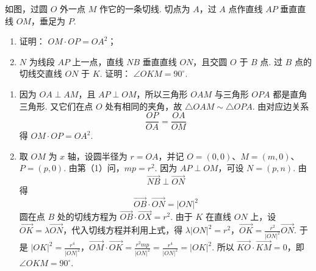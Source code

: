 \begin{problem}
如图，过圆 \(O\) 外一点 \(M\) 作它的一条切线. 切点为 \(A\)，过 \(A\) 点作直线 \(AP\) 垂直直线 \(OM\)，垂足为 \(P\).

\begin{enumerate}
\item 证明： \(OM \cdot OP = OA^2\)；
\item \(N\) 为线段 \(AP\) 上一点，直线 \(NB\) 垂直直线 \(ON\)，且交圆 \(O\) 于 \(B\) 点. 过 \(B\) 点的切线交直线 \(ON\) 于 \(K\). 证明： \(\angle OKM = 90^{\circ}\).
\end{enumerate}


\begin{solution}
\begin{enumerate}
\item 因为 \(OA\perp AM\)，且 \(AP\perp OM\)，所以三角形 \(OAM\) 与三角形 \(OPA\) 都是直角三角形. 又它们在点 \(O\) 处有相同的夹角，故
\(\triangle OAM\sim\triangle OPA\). 由对应边关系
\[
\frac{OP}{OA}=\frac{OA}{OM}
\]
得 \(OM\cdot OP=OA^2\).
\item 取 \(OM\) 为 \(x\) 轴，设圆半径为 \(r=OA\)，并记 \(O=(0,0)\)、\(M=(m,0)\)、\(P=(p,0)\). 由第（1）问，\(mp=r^2\). 因为 \(AP\perp OM\)，可设 \(N=(p,n)\). 由
\[
\overrightarrow{NB}\perp\overrightarrow{ON}
\]
得
\[
\overrightarrow{OB}\cdot\overrightarrow{ON}=|ON|^2
\]
圆在点 \(B\) 处的切线方程为 \(\overrightarrow{OB}\cdot\overrightarrow{OX}=r^2\). 由于 \(K\) 在直线 \(ON\) 上，设 \(\overrightarrow{OK}=\lambda\overrightarrow{ON}\)，代入切线方程并利用上式，得
\(\lambda|ON|^2=r^2\)，\(\overrightarrow{OK}=\frac{r^2}{|ON|^2}\overrightarrow{ON}\).
于是
\(|OK|^2=\frac{r^4}{|ON|^2}\)，\(\overrightarrow{OM}\cdot\overrightarrow{OK}=\frac{r^2mp}{|ON|^2}=\frac{r^4}{|ON|^2}=|OK|^2\).
所以 \(\overrightarrow{KO}\cdot\overrightarrow{KM}=0\)，即 \(\angle OKM=90^{\circ}\).
\end{enumerate}
\end{solution}
\end{problem}

